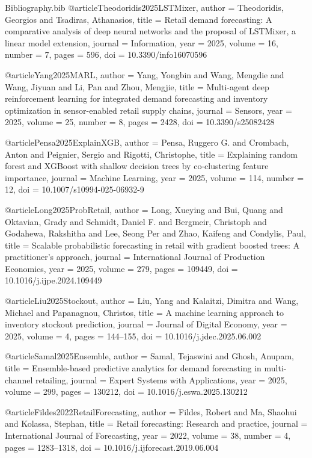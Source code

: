 \begin{filecontents*}{Bibliography.bib}
@article{Theodoridis2025LSTMixer,
  author  = {Theodoridis, Georgios and Tsadiras, Athanasios},
  title   = {Retail demand forecasting: A comparative analysis of deep neural networks and the proposal of LSTMixer, a linear model extension},
  journal = {Information},
  year    = {2025},
  volume  = {16},
  number  = {7},
  pages   = {596},
  doi     = {10.3390/info16070596}
}

@article{Yang2025MARL,
  author  = {Yang, Yongbin and Wang, Mengdie and Wang, Jiyuan and Li, Pan and Zhou, Mengjie},
  title   = {Multi-agent deep reinforcement learning for integrated demand forecasting and inventory optimization in sensor-enabled retail supply chains},
  journal = {Sensors},
  year    = {2025},
  volume  = {25},
  number  = {8},
  pages   = {2428},
  doi     = {10.3390/s25082428}
}

@article{Pensa2025ExplainXGB,
  author  = {Pensa, Ruggero G. and Crombach, Anton and Peignier, Sergio and Rigotti, Christophe},
  title   = {Explaining random forest and XGBoost with shallow decision trees by co-clustering feature importance},
  journal = {Machine Learning},
  year    = {2025},
  volume  = {114},
  number  = {12},
  doi     = {10.1007/s10994-025-06932-9}
}

@article{Long2025ProbRetail,
  author  = {Long, Xueying and Bui, Quang and Oktavian, Grady and Schmidt, Daniel F. and Bergmeir, Christoph and Godahewa, Rakshitha and Lee, Seong Per and Zhao, Kaifeng and Condylis, Paul},
  title   = {Scalable probabilistic forecasting in retail with gradient boosted trees: A practitioner's approach},
  journal = {International Journal of Production Economics},
  year    = {2025},
  volume  = {279},
  pages   = {109449},
  doi     = {10.1016/j.ijpe.2024.109449}
}

@article{Liu2025Stockout,
  author  = {Liu, Yang and Kalaitzi, Dimitra and Wang, Michael and Papanagnou, Christos},
  title   = {A machine learning approach to inventory stockout prediction},
  journal = {Journal of Digital Economy},
  year    = {2025},
  volume  = {4},
  pages   = {144--155},
  doi     = {10.1016/j.jdec.2025.06.002}
}

@article{Samal2025Ensemble,
  author  = {Samal, Tejaswini and Ghosh, Anupam},
  title   = {Ensemble-based predictive analytics for demand forecasting in multi-channel retailing},
  journal = {Expert Systems with Applications},
  year    = {2025},
  volume  = {299},
  pages   = {130212},
  doi     = {10.1016/j.eswa.2025.130212}
}

@article{Fildes2022RetailForecasting,
  author  = {Fildes, Robert and Ma, Shaohui and Kolassa, Stephan},
  title   = {Retail forecasting: Research and practice},
  journal = {International Journal of Forecasting},
  year    = {2022},
  volume  = {38},
  number  = {4},
  pages   = {1283--1318},
  doi     = {10.1016/j.ijforecast.2019.06.004}
}


\end{filecontents*}
